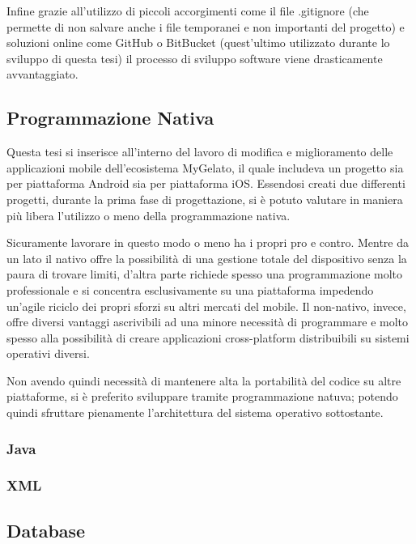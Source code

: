 Infine grazie all'utilizzo di piccoli accorgimenti come il file .gitignore (che permette di non salvare anche i file temporanei e non importanti del progetto) e soluzioni online come GitHub o BitBucket (quest'ultimo utilizzato durante lo sviluppo di questa tesi) il processo di sviluppo software viene drasticamente avvantaggiato.

\subsection{Programmazione Nativa}
Questa tesi si inserisce all'interno del lavoro di modifica e miglioramento delle applicazioni mobile dell'ecosistema MyGelato, il quale includeva un progetto sia per piattaforma Android sia per piattaforma iOS.
Essendosi creati due differenti progetti, durante la prima fase di progettazione, si è potuto valutare in maniera più libera l'utilizzo o meno della programmazione nativa.

Sicuramente lavorare in questo modo o meno ha i propri pro e contro. Mentre da un lato il nativo offre la possibilità di una gestione totale del dispositivo senza la paura di trovare limiti, d’altra parte richiede spesso una programmazione molto professionale e si concentra esclusivamente su una piattaforma impedendo un’agile riciclo dei propri sforzi su altri mercati del mobile. 
Il non-nativo, invece, offre diversi vantaggi ascrivibili ad una minore necessità di programmare e molto spesso alla possibilità di creare applicazioni cross-platform distribuibili su sistemi operativi diversi.\autocite{HTMLIT:PROG_NATIVA}

Non avendo quindi necessità di mantenere alta la portabilità del codice su altre piattaforme, si è preferito sviluppare tramite programmazione natuva; potendo quindi sfruttare pienamente l'architettura del sistema operativo sottostante.

\subsubsection{Java}


\subsubsection{XML}


\subsection{Database}


